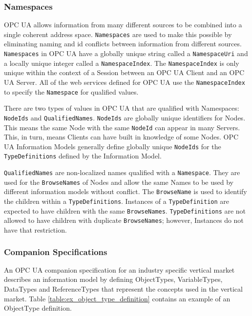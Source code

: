 \subsubsection{Namespaces}

OPC UA allows information from many different sources to be combined into a single coherent address space. \texttt{Namespaces} are used to make this possible by eliminating naming and id conflicts between information from different sources. \texttt{Namespaces} in OPC UA have a globally unique string called a \texttt{NamespaceUri} and a locally unique integer called a \texttt{NamespaceIndex}. The \texttt{NamespaceIndex} is only unique within the context of a Session between an OPC UA Client and an OPC UA Server. All of the web services defined for OPC UA use the \texttt{NamespaceIndex} to specify the \texttt{Namespace} for qualified values.

There are two types of values in OPC UA that are qualified with Namespaces: \texttt{NodeIds} and \texttt{QualifiedNames}. \texttt{NodeIds} are globally unique identifiers for Nodes. This means the same Node with the same \texttt{NodeId} can appear in many Servers. This, in turn, means Clients can have built in knowledge of some Nodes. OPC UA Information Models generally define globally unique \texttt{NodeIds} for the \texttt{TypeDefinitions} defined by the Information Model.

\texttt{QualifiedNames} are non-localized names qualified with a \texttt{Namespace}. They are used for the \texttt{BrowseNames} of Nodes and allow the same Names to be used by different information models without conflict. The \texttt{BrowseName} is used to identify the children within a \texttt{TypeDefinitions}. Instances of a \texttt{TypeDefinition} are expected to have children with the same \texttt{BrowseNames}. \texttt{TypeDefinitions} are not allowed to have children with duplicate \texttt{BrowseNames}; however, Instances do not have that restriction.

\subsubsection{Companion Specifications}

An OPC UA companion specification for an industry specific vertical market describes an information model by defining ObjectTypes, VariableTypes, DataTypes and ReferenceTypes that represent the concepts used in the vertical market. Table \ref{table:ex_object_type_definition} contains an example of an ObjectType definition.


